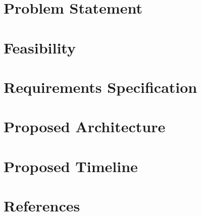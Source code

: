 \documentclass[10pt]{article}
\begin{document}
    

    \tableofcontents
    \newpage

    \section{Problem Statement}
    

    \section{Feasibility}
    

    \section{Requirements Specification}
    

    \section{Proposed Architecture}
    

    \section{Proposed Timeline}
    

    \section{References}
    
\end{document}
